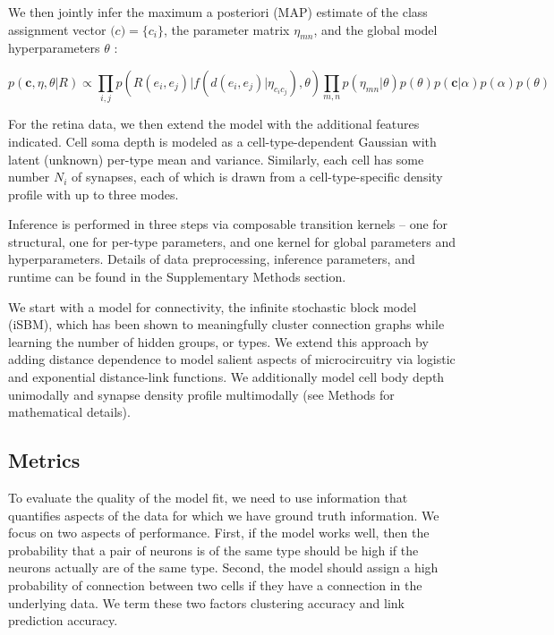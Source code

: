 \documentclass{article}
\renewcommand{\vec}[1]{\mathbf{#1}}
\begin{document}
We then jointly infer the maximum a posteriori (MAP) estimate of the
class assignment vector $\vec(c) = \{c_i\}$, the parameter matrix
$\eta_{mn}$, and the global model hyperparameters $\theta$ :

\begin{equation}
  p(\vec{c}, \eta, \theta | R ) \propto \prod_{i, j} p(R(e_i, e_j) | f(d(e_i, e_j) | \eta_{c_ic_j}), \theta) \prod_{m, n} p(\eta_{mn} | \theta)  p(\theta) p(\vec{c} | \alpha) p(\alpha) p(\theta)
\end{equation}

For the retina data, we then extend the model with the additional
features indicated. Cell soma depth is modeled as a
cell-type-dependent Gaussian with latent (unknown) per-type mean and
variance. Similarly, each cell has some number $N_i$ of synapses, 
each of which is drawn from a cell-type-specific density profile
with up to three modes.

Inference is performed in three steps via composable transition 
kernels -- one for structural, one for per-type parameters, and
one kernel for global parameters and hyperparameters. Details
of data preprocessing, inference parameters, and runtime can
be found in the Supplementary Methods section. 


We start with a model for connectivity, the infinite stochastic block
model (iSBM)\autocite{Kemp2006a,Xu2006}, which has been shown to
meaningfully cluster connection graphs while learning the number of
hidden groups, or types. We extend this approach by adding distance
dependence to model salient aspects of microcircuitry via logistic and
exponential distance-link functions.  We additionally model cell body
depth unimodally and synapse density profile multimodally (see
Methods for mathematical details).


\subsection*{Metrics}
To evaluate the quality of the model fit, we need to use information that quantifies aspects of the data for which we have ground truth information. We focus on two aspects of performance. First, if the model works well, then the probability that a pair of neurons is of the same type should be high if the neurons actually are of the same type. Second, the model should assign a high probability of connection between two cells if they have a connection in the underlying data. We term these two factors clustering accuracy and link prediction accuracy.
\end{document}
